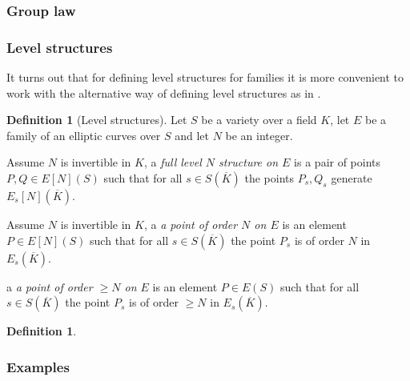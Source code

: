 \documentclass[a4paper,12pt,reqno]{amsart}
\theoremstyle{definition}
\newtheorem{definition}[lemma]{Definition}
\numberwithin{lemma}{section}
\numberwithin{equation}{section}
\numberwithin{figure}{section}
\begin{document}

\subsubsection{Group law}

\subsubsection{Level structures}

It turns out that for defining level structures for families it is more convenient to work with the alternative way of defining level structures as in .
\begin{definition}[Level structures]\label{def:level-structures-over-var}
	Let $S$ be a variety over a field $K$, let $E$ be a family of an elliptic curves over $S$ and let $N$ be an integer. 
	\begin{defenum}
		\item Assume $N$ is invertible in $K$, a \textit{full level $N$ structure on $E$} is a pair of points $P,Q \in E[N](S)$  such that for all $s \in S(\overline K)$ the points $P_s, Q_s$ generate $E_s[N](\overline K)$. \label{def:full-level-structure-over-var}
		\item Assume $N$ is invertible in $K$,  a \textit{a point of order $N$ on $E$} is an element $P \in E[N](S)$ such that  for all $s \in S(\overline K)$ the point $P_s$ is of order $N$ in $E_s(\overline K)$.  \label{def:point-of-order-N-over-var}
		\item  a \textit{a point of order $\geq N$ on $E$} is an element $P \in E(S)$ such that  for all $s \in S(\overline K)$ the point $P_s$ is of order $\geq N$ in $E_s(\overline K)$.\label{def:point-of-order-geq-N-over-var}
	\end{defenum}
\end{definition}

\begin{definition}
	\hspace{1em}
\end{definition}

\subsubsection{Examples}
\end{document}
